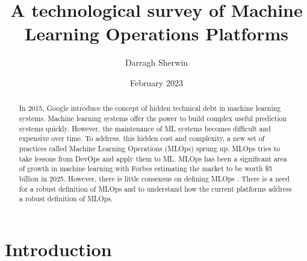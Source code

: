 \documentclass[12pt, a4paper]{article}
\title{A technological survey of Machine Learning Operations Platforms}
\author{Darragh Sherwin}
\date{February 2023}
\begin{document}
\maketitle
\begin{abstract}
In 2015, Google introduce the concept of hidden technical debt in machine learning systems\autocite{sculleyHiddenTechnicalDebt2015}. Machine learning systems offer the power to build complex useful prediction systems quickly. However, the maintenance of ML systems becomes difficult and expensive over time. To address, this hidden cost and complexity, a new set of practices called Machine Learning Operations (MLOps) sprung up. MLOps tries to take lessons from DevOps and apply them to ML. 
\linebreak
MLOps has been a significant area of growth in machine learning with Forbes estimating the market to be worth \$5 billion in 2025. However, there is little consensus on defining MLOps \autocite{mboweniSystematicReviewMachine2022}.
There is a need for a robust definition of MLOps and to understand how the current platforms address a robust definition of MLOps.

\end{abstract}

\section{Introduction}
\end{document}
